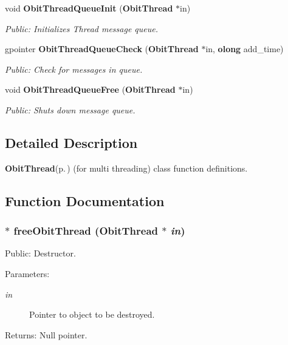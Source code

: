 \begin{CompactItemize}
void {\bf Obit\-Thread\-Queue\-Init} ({\bf Obit\-Thread} $\ast$in)
\begin{CompactList}\small\item\em Public: Initializes Thread message queue. \item\end{CompactList}\item 
gpointer {\bf Obit\-Thread\-Queue\-Check} ({\bf Obit\-Thread} $\ast$in, {\bf olong} add\_\-time)
\begin{CompactList}\small\item\em Public: Check for messages in queue. \item\end{CompactList}\item 
void {\bf Obit\-Thread\-Queue\-Free} ({\bf Obit\-Thread} $\ast$in)
\begin{CompactList}\small\item\em Public: Shuts down message queue. \item\end{CompactList}\end{CompactItemize}


\subsection{Detailed Description}
{\bf Obit\-Thread}{\rm (p.\,\pageref{structObitThread})} (for multi threading) class function definitions. 



\subsection{Function Documentation}
\subsubsection{$\ast$ free\-Obit\-Thread ({\bf Obit\-Thread} $\ast$ {\em in})}\label{ObitThread_8c_a3}


Public: Destructor. 

\begin{Desc}
\item[Parameters:]
\begin{description}
\item[{\em in}]Pointer to object to be destroyed. \end{description}
\end{Desc}
\begin{Desc}
\item[Returns:]Null pointer. \end{Desc}
